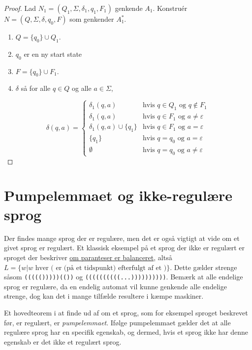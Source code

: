 \begin{proof}
Lad $N_1 = (Q_1, \Sigma, \delta_1, q_1, F_1)$ genkende $A_1$.
Konstruér $N = (Q, \Sigma, \delta, q_0, F)$ som genkender $A_1^*$.

\begin{enumerate}
    \item $Q = \{q_0\} \cup Q_1$.
    \item $q_{0}$ er en ny start state
    \item $F = \{q_0\} \cup F_1$.
  \item  $\delta$ så for alle $q \in Q$ og alle $a \in \Sigma$,
\end{enumerate}
\[
\delta(q, a) = \begin{cases}
\delta_1(q, a) & \text{hvis } q \in Q_1 \text{ og } q \notin F_1 \\
\delta_1(q, a) & \text{hvis } q \in F_1 \text{ og } a \neq \varepsilon \\
\delta_1(q, a) \cup \{q_1\} & \text{hvis } q \in F_1 \text{ og } a = \varepsilon \\
\{q_1\} & \text{hvis } q = q_0 \text{ og } a = \varepsilon \\
\emptyset & \text{hvis } q = q_0 \text{ og } a \neq \varepsilon
\end{cases}
\]
\end{proof}

\newpage
\section{Pumpelemmaet og ikke-regulære sprog}

Der findes mange sprog der er regulære, men det er også vigtigt at vide om et givet sprog er regulært. Et klassisk eksempel på et sprog der ikke er regulært er sproget der beskriver \href{https://www.hackerrank.com/challenges/balanced-brackets/problem}{om paranteser er balanceret}, altså $L = \{w | w \text{ hver ( er (på et tidspunkt) efterfulgt af et )}\}$. Dette gælder strenge såsom \texttt{((((()))))(())} og \texttt{((((((((((...))))))))))}. Bemærk at alle endelige sprog er regulære, da en endelig automat vil kunne genkende alle endelige strenge, dog kan det i mange tilfælde resultere i kæmpe maskiner.

Et hovedteorem i at finde ud af om et sprog, som for eksempel sproget beskrevet før, er regulært, er \textit{pumpelemmaet}. Ifølge pumpelemmaet gælder det at alle regulære sprog har en specifik egenskab, og dermed, hvis et sprog ikke har denne egenskab er det ikke et regulært sprog.


